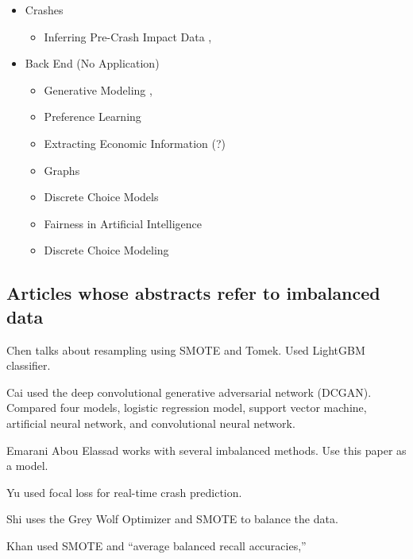 \begin{itemize}
	\item Crashes
	\begin{itemize}
	\item Inferring Pre-Crash Impact Data
		\cite{CHEN2021103009},
	\end{itemize}
	
	\item Back End (No Application)
	\begin{itemize}
	\item Generative Modeling
		\cite{BORYSOV201973},
		\cite{GARRIDO2020102787}
	\item Preference Learning
		\cite{ZHU2020102849}
	\item Extracting Economic Information (?)
		\cite{WANG2020102701}
	\item Graphs
		\cite{RODRIGUEZDENIZ2022103556}
	\item Discrete Choice Models
		\cite{SFEIR2022103552}
	\item Fairness in Artificial Intelligence
		\cite{ZHENG2021103410}
	\item Discrete Choice Modeling
		\cite{WONG2021103050}
	\end{itemize}

\end{itemize}
 
\subsection{Articles whose abstracts refer to imbalanced data}

\vskip 0pt

Chen \cite{CHEN2020102646} talks about resampling using SMOTE and Tomek.  Used LightGBM classifier.  

Cai \cite{CAI2020102697} used the deep convolutional generative adversarial network (DCGAN).  Compared four models, logistic regression model, support vector machine, artificial neural network, and convolutional neural network.  

Emarani Abou Elassad \cite{ELAMRANIABOUELASSAD2020102708} works with several imbalanced methods.  Use this paper as a model.  

Yu \cite{YU2020102740} used focal loss for real-time crash prediction.  

Shi \cite{SHI2021103414} uses the Grey Wolf Optimizer and SMOTE to balance the data.  

Khan \cite{KHAN2021103225} used SMOTE and ``average balanced recall accuracies,''

